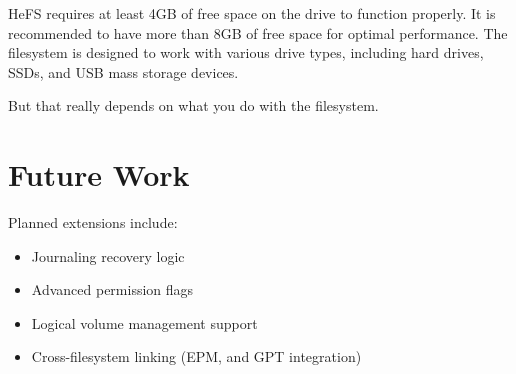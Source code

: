 \documentclass{article}
\begin{document}
HeFS requires at least 4GB of free space on the drive to function properly.
It is recommended to have more than 8GB of free space for optimal performance. 
The filesystem is designed to work with various drive types, including hard drives, SSDs, and USB mass storage devices.

But that really depends on what you do with the filesystem.

\section{Future Work}
Planned extensions include:
\begin{itemize}
    \item Journaling recovery logic
    \item Advanced permission flags
    \item Logical volume management support
    \item Cross-filesystem linking (EPM, and GPT integration)
\end{itemize}
\end{document}
